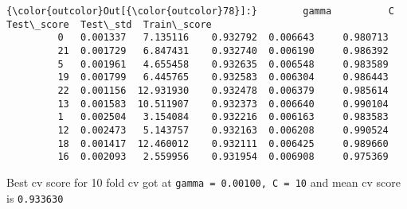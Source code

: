 \documentclass[11pt]{article}
\begin{document}
\begin{Verbatim}[commandchars=\\\{\}]
{\color{outcolor}Out[{\color{outcolor}78}]:}        gamma          C  Test\_score  Test\_std  Train\_score
         0   0.001337   7.135116    0.932792  0.006643     0.980713
         21  0.001729   6.847431    0.932740  0.006190     0.986392
         5   0.001961   4.655458    0.932635  0.006548     0.983589
         19  0.001799   6.445765    0.932583  0.006304     0.986443
         22  0.001156  12.931930    0.932478  0.006379     0.985614
         13  0.001583  10.511907    0.932373  0.006640     0.990104
         1   0.002504   3.154084    0.932216  0.006163     0.983583
         12  0.002473   5.143757    0.932163  0.006208     0.990524
         18  0.001417  12.460012    0.932111  0.006425     0.989660
         16  0.002093   2.559956    0.931954  0.006908     0.975369
\end{Verbatim}
            
    Best cv score for 10 fold cv got at
\texttt{gamma\ =\ 0.00100,\ C\ =\ 10} and mean cv score is
\texttt{0.933630}
\end{document}
